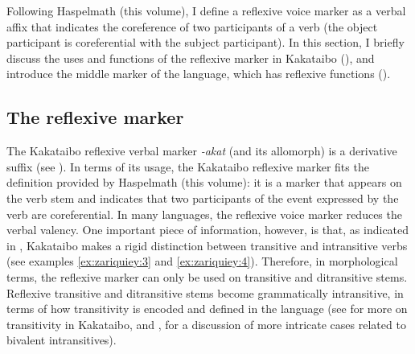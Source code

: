 \documentclass[output=paper,colorlinks,citecolor=brown,modfonts,nonflat]{langscibook}
\begin{document}
Following Haspelmath (this volume), I define a reflexive voice marker as a verbal affix that indicates the coreference of two participants of a verb (the object participant is coreferential with the subject participant). In this section, I briefly discuss the uses and functions of the reflexive marker in Kakataibo (), and introduce the middle marker of the language, which has reflexive functions ().

\subsection{The reflexive marker}\label{sec:zariquiey:3.1}

The Kakataibo reflexive verbal marker \textit{{}-akat} (and its allomorph) is a derivative suffix (see \citealt[307]{Zariquiey2018}). In terms of its usage, the Kakataibo reflexive marker fits the definition provided by Haspelmath (this volume): it is a marker that appears on the verb stem and indicates that two participants of the event expressed by the verb are coreferential. In many languages, the reflexive voice marker reduces the verbal valency. One important piece of information, however, is that, as indicated in , Kakataibo makes a rigid distinction between transitive and intransitive verbs (see examples \ref{ex:zariquiey:3} and \ref{ex:zariquiey:4}). Therefore, in morphological terms, the reflexive marker can only be used on transitive and ditransitive stems. Reflexive transitive and ditransitive stems become grammatically intransitive, in terms of how transitivity is encoded and defined in the language (see \citealt[217ss]{Zariquiey2018} for more on transitivity in Kakataibo, and \citealt{Zariquiey2017}, for a discussion of more intricate cases related to bivalent intransitives). 
\end{document}
